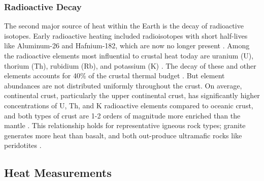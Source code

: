 \subsubsection{Radioactive Decay}\label{ch2:radio}
The second major source of heat within the Earth is the decay of radioactive isotopes. Early radioactive heating included radioisotopes with short half-lives like Aluminum-26 and Hafnium-182, which are now no longer present \citep[~p. 16]{glassley_geothermal_2015}. Among the radioactive elements most influential to crustal heat  today are uranium (U), thorium (Th), rubidium (Rb), and potassium (K) \citep[~p. 17]{glassley_geothermal_2015}. The decay of these and other elements accounts for 40\% of the crustal thermal budget \citep{stein_heat_1995}. But element abundances are not distributed uniformly throughout the crust. On average, continental crust, particularly the upper continental crust, has significantly higher concentrations of U, Th, and K radioactive elements compared to oceanic crust, and both types of crust are 1-2 orders of magnitude more enriched than the mantle \citep[~p. 276]{fowler_solid_2005}. This relationship holds for representative igneous rock types; granite generates more heat than basalt, and both out-produce ultramafic rocks like peridotites \citep[~p. 276]{fowler_solid_2005}.

\subsection{Heat Measurements}\label{ch2:heatmeas}
